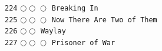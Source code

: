 \documentclass[a4paper,landscape]{article}
\begin{document}
\begin{multicols*}{5}
\texttt{224} \(\bigcirc\!\bigcirc\!\bigcirc\)  \texttt{Breaking In} \vspace{-0.3mm}\\ 
\texttt{225} \(\bigcirc\!\bigcirc\!\bigcirc\)  \texttt{Now There Are Two of Them} \vspace{-0.3mm}\\ 
\texttt{226} \(\bigcirc\!\bigcirc\)  \texttt{Waylay} \vspace{-0.3mm}\\ 
\texttt{227} \(\bigcirc\!\bigcirc\!\bigcirc\)  \texttt{Prisoner of War} \vspace{-0.3mm}\\ 

\end{multicols*}
\end{document}
